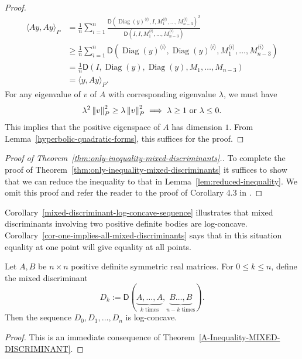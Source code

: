 \documentclass{puthesis-UG}
\begin{document}
\begin{proof}
	\begin{align*}
		\langle Ay, Ay \rangle_P & = \frac{1}{n} \sum_{i = 1}^n \frac{\mathsf{D}(\operatorname{Diag}(y)^{\langle i \rangle}, I, M_1^{\langle i \rangle}, \ldots, M_{n-3}^{\langle i \rangle})^2}{\mathsf{D} (I, I, M_1^{\langle i \rangle}, \ldots, M_{n-3}^{\langle i \rangle})} \\
		& \geq \frac{1}{n} \sum_{i = 1}^n \mathsf{D}(\operatorname{Diag}(y)^{\langle i \rangle}, \operatorname{Diag}(y)^{\langle i \rangle}, M_1^{\langle i \rangle}, \ldots, M_{n-3}^{\langle i \rangle} ) \\
		& = \frac{1}{n} \mathsf{D}(I, \operatorname{Diag}(y), \operatorname{Diag}(y), M_1, \ldots, M_{n-3}) \\
		& = \langle y, Ay \rangle_P.
	\end{align*}
	For any eigenvalue of $v$ of $A$ with corresponding eigenvalue $\lambda$, we must have 
	\[
		\lambda^2 \left\lVert v\right\rVert_P^2 \geq \lambda \left\lVert v\right\rVert_P^2 \implies \lambda \geq 1 \text{ or } \lambda \leq 0.
	\]
	This implies that the positive eigenspace of $A$ has dimension $1$. From Lemma~\ref{hyperbolic-quadratic-forms}, this suffices for the proof. 
\end{proof}

\begin{proof}[Proof of Theorem~\ref{thm:only-inequality-mixed-discriminants}.]
	To complete the proof of Theorem~\ref{thm:only-inequality-mixed-discriminants} it suffices to show that we can reduce the inequality to that in Lemma~\ref{lem:reduced-inequality}. We omit this proof and refer the reader to the proof of Corollary 4.3 in \cite{bochner}. 
\end{proof}

Corollary~\ref{mixed-discriminant-log-concave-sequence} illustrates that mixed discriminants involving two positive definite bodies are log-concave. Corollary~\ref{cor-one-implies-all-mixed-discriminants} says that in this situation equality at one point will give equality at all points. 

\begin{cor} \label{mixed-discriminant-log-concave-sequence}
	Let $A, B$ be $n \times n$ positive definite symmetric real matrices. For $0 \leq k \leq n$, define the mixed discriminant
	\[
		D_k := \mathsf{D} (\underbrace{A, \ldots, A}_{k \text{ times}}, \underbrace{B \ldots, B}_{n-k \text{ times}}).
	\]
	Then the sequence $D_0, D_1, \ldots, D_n$ is log-concave. 
\end{cor}

\begin{proof}
	This is an immediate consequence of Theorem~\ref{A-Inequality-MIXED-DISCRIMINANT}. 
\end{proof}
\end{document}
